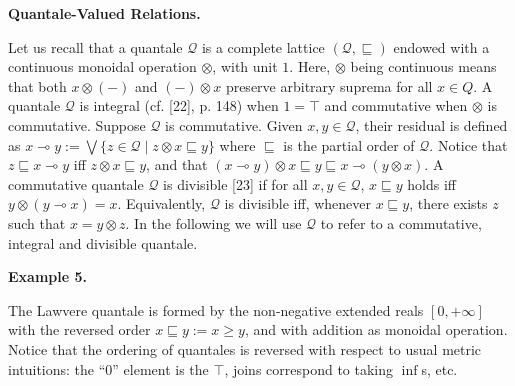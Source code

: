 \documentclass[10pt,a4paper]{amsart}
\begin{document}
 
 
\par\medskip\noindent\textbf{Quantale-Valued Relations.}\par
 
 
Let us recall that a quantale $\mathcal{Q}$ is a complete lattice $(\mathcal{Q},\sqsubseteq)$ endowed with a continuous monoidal operation $\otimes$, with unit $1$. Here, $\otimes$ being continuous means that both $x\otimes(-)$ and $(-)\otimes x$ preserve arbitrary suprema for all $x\in Q$. A quantale $\mathcal{Q}$ is integral (cf. [22], p. 148) when $1=\top$ and commutative when $\otimes$ is commutative. Suppose $\mathcal{Q}$ is commutative. Given $x,y\in\mathcal{Q}$, their residual is defined as $x\multimap y:=\bigvee\{z\in\mathcal{Q}\mid z\otimes x\sqsubseteq y\}$ where $\sqsubseteq$ is the partial order of $\mathcal{Q}$. Notice that $z\sqsubseteq x\multimap y$ iff $z\otimes x\sqsubseteq y$, and that $(x\multimap y)\otimes x\sqsubseteq y\sqsubseteq x\multimap(y\otimes x)$. A commutative quantale $\mathcal{Q}$ is divisible [23] if for all $x,y\in\mathcal{Q}$, $x\sqsubseteq y$ holds iff $y\otimes(y\multimap x)=x$. Equivalently, $\mathcal{Q}$ is divisible iff, whenever $x\sqsubseteq y$, there exists $z$ such that $x=y\otimes z$. In the following we will use $\mathcal{Q}$ to refer to a commutative, integral and divisible quantale.\par
 
 
 
\par\medskip\noindent\textbf{Example 5.}\par
 
 
The Lawvere quantale is formed by the non-negative extended reals $[0,+\infty]$ with the reversed order $x\sqsubseteq y:=x\geq y$, and with addition as monoidal operation. Notice that the ordering of quantales is reversed with respect to usual metric intuitions: the “$0$” element is the $\top$, joins correspond to taking $\inf$s, etc.\par
 
 
 
 
\end{document}
